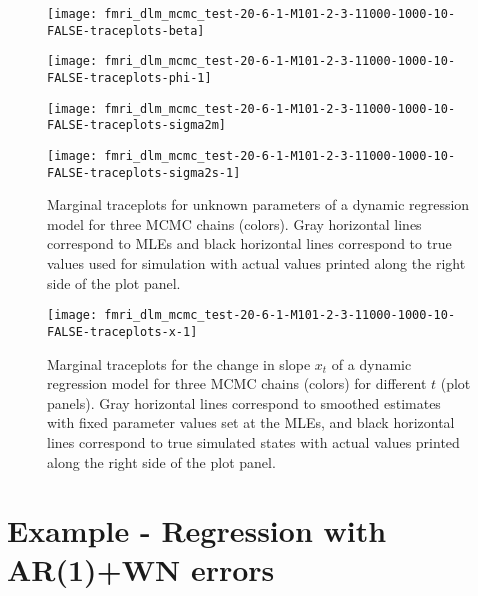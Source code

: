 \documentclass{article}
\begin{document}
\begin{figure}[ht]
\begin{minipage}{0.5\linewidth}
\texttt{[image: fmri\_dlm\_mcmc\_test-20-6-1-M101-2-3-11000-1000-10-FALSE-traceplots-beta]}
\end{minipage}
\begin{minipage}{0.5\linewidth}
\texttt{[image: fmri\_dlm\_mcmc\_test-20-6-1-M101-2-3-11000-1000-10-FALSE-traceplots-phi-1]}
\end{minipage}
\begin{minipage}{0.5\linewidth}
\texttt{[image: fmri\_dlm\_mcmc\_test-20-6-1-M101-2-3-11000-1000-10-FALSE-traceplots-sigma2m]}
\end{minipage}
\begin{minipage}{0.5\linewidth}
\texttt{[image: fmri\_dlm\_mcmc\_test-20-6-1-M101-2-3-11000-1000-10-FALSE-traceplots-sigma2s-1]}
\end{minipage}
\caption{Marginal traceplots for unknown parameters of a dynamic regression model for three MCMC chains (colors). Gray horizontal lines correspond to MLEs and black horizontal lines correspond to true values used for simulation with actual values printed along the right side of the plot panel.} \label{fig:tracetheta}
\end{figure}

\begin{figure}[ht]
\texttt{[image: fmri\_dlm\_mcmc\_test-20-6-1-M101-2-3-11000-1000-10-FALSE-traceplots-x-1]}
\caption{Marginal traceplots for the change in slope $x_t$ of a dynamic regression model for three MCMC chains (colors) for different $t$ (plot panels). Gray horizontal lines correspond to smoothed estimates with fixed parameter values set at the MLEs, and black horizontal lines correspond to true simulated states with actual values printed along the right side of the plot panel.} \label{fig:tracex}
\end{figure}

\clearpage

\section{Example - Regression with AR(1)+WN errors} \label{sec:exar}
\end{document}
